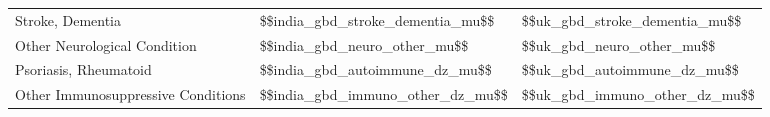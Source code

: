 \begin{tabular}{p{6cm}p{1.1cm}p{1cm}}
Stroke, Dementia & \num{$$india_gbd_stroke_dementia_mu$$} & \num{$$uk_gbd_stroke_dementia_mu$$} \\[0.25ex]
Other Neurological Condition & \num{$$india_gbd_neuro_other_mu$$} & \num{$$uk_gbd_neuro_other_mu$$} \\[0.25ex]
Psoriasis, Rheumatoid & \num{$$india_gbd_autoimmune_dz_mu$$} & \num{$$uk_gbd_autoimmune_dz_mu$$} \\[0.25ex]
Other Immunosuppressive Conditions & \num{$$india_gbd_immuno_other_dz_mu$$} & \num{$$uk_gbd_immuno_other_dz_mu$$} \\[0.25ex]
\end{tabular}
